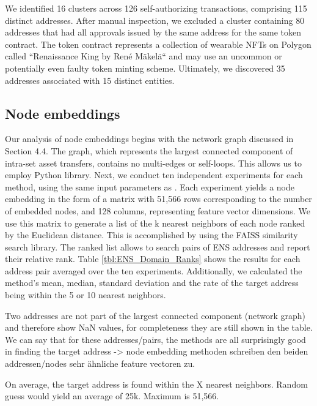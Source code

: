 \documentclass[12pt,a4paper,titlepage,oneside,english]{article}
\begin{document}
We identified 16 clusters across 126 self-authorizing transactions, comprising 115 distinct addresses. After manual inspection, we excluded a cluster containing 80 addresses that had all approvals issued by the same address for the same token contract. The token contract represents a collection of wearable NFTs on Polygon called ``Renaissance King by René Mäkelä`` and may use an uncommon or potentially even faulty token minting scheme. Ultimately, we discovered 35 addresses associated with 15 distinct entities.

\subsection{Node embeddings}

Our analysis of node embeddings begins with the network graph discussed in Section 4.4. The graph, which represents the largest connected component of intra-set asset transfers, contains no multi-edges or self-loops. This allows us to employ \cite{karateclub} Python library. \newline
Next, we conduct ten independent experiments for each method, using the same input parameters as \cite{Beres2020}. Each experiment yields a node embedding in the form of a matrix with 51,566 rows corresponding to the number of embedded nodes, and 128 columns, representing feature vector dimensions. We use this matrix to generate a list of the k nearest neighbors of each node ranked by the Euclidean distance. This is accomplished by using the FAISS similarity search library. \newline
The ranked list allows to search pairs of ENS addresses and report their relative rank. Table \ref{tbl:ENS_Domain_Ranks} shows the results for each address pair averaged over the ten experiments. Additionally, we calculated the method's mean, median, standard deviation and the rate of the target address being within the 5 or 10 nearest neighbors.

Two addresses are not part of the largest connected component (network graph) and therefore show NaN values, for completeness they are still shown in the table.
We can say that for these addresses/pairs, the methods are all surprisingly good in finding the target address -> node embedding methoden schreiben den beiden addressen/nodes sehr ähnliche feature vectoren zu.

On average, the target address is found within the X nearest neighbors. Random guess would yield an average of 25k. Maximum is 51,566. 
\end{document}
